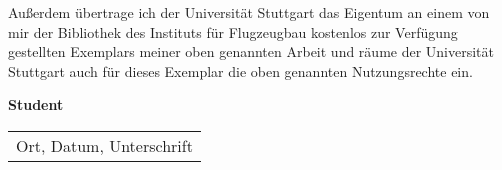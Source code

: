 Außerdem übertrage ich der Universität Stuttgart das Eigentum an einem von mir der Bibliothek des Instituts für Flugzeugbau kostenlos zur Verfügung gestellten Exemplars meiner oben genannten Arbeit und räume der Universität Stuttgart auch für dieses Exemplar die oben genannten Nutzungsrechte ein.
\\
\begin{flushleft}	
	\begin{minipage}[]{1\textwidth}
		\begingroup
		\begin{minipage}[t]{0.5\textwidth}
			\textbf{Student}
		\end{minipage}%
		\hfill
		\begin{minipage}[t]{0.5\textwidth}
			\begin{tabular}{l}
				\\ \cline{1-1}
				\phantom{12}Ort, Datum, Unterschrift\phantom{12}
			\end{tabular}
				
		\end{minipage}%
		\par\endgroup
	\end{minipage}
	\\	
\end{flushleft}